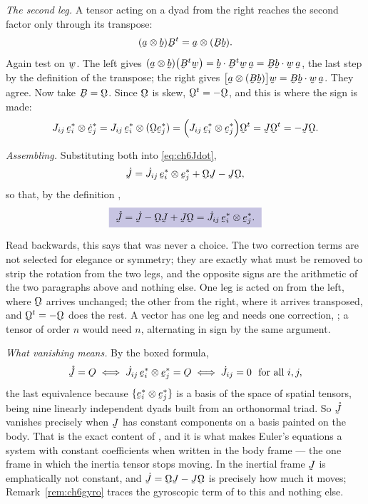 \begin{solution}
\medskip
\noindent\emph{The second leg.}
A tensor acting on a dyad from the right reaches the second factor only
through its transpose:
\[
   (\ba\otimes\bb)\bB^{t}=\ba\otimes(\bB\bb) .
\]
Again test on $\bw$. The left gives
$(\ba\otimes\bb)\big(\bB^{t}\bw\big)=\ip\bb{\bB^{t}\bw}\,\ba
=\ip{\bB\bb}{\bw}\,\ba$, the last step by the definition of the
transpose; the right gives $\big[\ba\otimes(\bB\bb)\big]\bw
=\ip{\bB\bb}\bw\,\ba$. They agree. Now take $\bB=\bOm$. Since
$\bOm$ is skew, $\bOm^{t}=-\bOm$, and this is where the sign is made:
\[
   J_{ij}\,\be^{*}_{i}\otimes\dot{\be}^{*}_{j}
   =J_{ij}\,\be^{*}_{i}\otimes(\bOm\be^{*}_{j})
   =\Big(J_{ij}\,\be^{*}_{i}\otimes\be^{*}_{j}\Big)\bOm^{t}
   =\vek{J}\bOm^{t}
   =-\vek{J}\bOm .
\]

\medskip
\noindent\emph{Assembling.}
Substituting both into \eqref{eq:ch6Jdot},
\[
   \dot{\vek{J}}=\dot J_{ij}\,\be^{*}_{i}\otimes\be^{*}_{j}
   +\bOm\vek{J}-\vek{J}\bOm ,
\]
so that, by the definition ,
\[
   \boxed{\ \mathring{\vek{J}}
   =\dot{\vek{J}}-\bOm\vek{J}+\vek{J}\bOm
   =\dot J_{ij}\,\be^{*}_{i}\otimes\be^{*}_{j} .\ }
\]

Read backwards, this says that  was never a choice. The two
correction terms are not selected for elegance or symmetry; they are
exactly what must be removed to strip the rotation from the two legs,
and the opposite signs are the arithmetic of the two paragraphs above
and nothing else. One leg is acted on from the left, where $\bOm$
arrives unchanged; the other from the right, where it arrives
transposed, and $\bOm^{t}=-\bOm$ does the rest. A vector has one leg
and needs one correction, ; a tensor of order $n$ would need
$n$, alternating in sign by the same argument.

\medskip
\noindent\emph{What vanishing means.}
By the boxed formula,
\[
   \mathring{\vek{J}}=\Ob
   \iff
   \dot J_{ij}\,\be^{*}_{i}\otimes\be^{*}_{j}=\Ob
   \iff
   \dot J_{ij}=0\ \text{ for all }i,j ,
\]
the last equivalence because $\{\be^{*}_{i}\otimes\be^{*}_{j}\}$ is a
basis of the space of spatial tensors, being nine linearly independent
dyads built from an orthonormal triad. So $\mathring{\vek{J}}$ vanishes
precisely when $\vek{J}$ has constant components on a basis painted on
the body. That is the exact content of , and it is what makes
Euler's equations  a system with constant coefficients when
written in the body frame --- the one frame in which the inertia tensor
stops moving. In the inertial frame $\vek{J}$ is emphatically not
constant, and $\dot{\vek{J}}=\bOm\vek{J}-\vek{J}\bOm$ is precisely how
much it moves; Remark~\ref{rem:ch6gyro} traces the gyroscopic term of
 to this and nothing else.
\end{solution}

